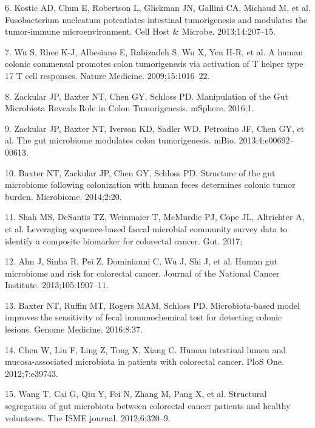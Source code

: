 \documentclass[12pt,]{article}
\begin{document}
\hypertarget{ref-kostic_fusobacterium_2013}{}
6. Kostic AD, Chun E, Robertson L, Glickman JN, Gallini CA, Michaud M,
et al. Fusobacterium nucleatum potentiates intestinal tumorigenesis and
modulates the tumor-immune microenvironment. Cell Host \& Microbe.
2013;14:207--15.

\hypertarget{ref-wu_human_2009}{}
7. Wu S, Rhee K-J, Albesiano E, Rabizadeh S, Wu X, Yen H-R, et al. A
human colonic commensal promotes colon tumorigenesis via activation of T
helper type 17 T cell responses. Nature Medicine. 2009;15:1016--22.

\hypertarget{ref-zackular_manipulation_2016}{}
8. Zackular JP, Baxter NT, Chen GY, Schloss PD. Manipulation of the Gut
Microbiota Reveals Role in Colon Tumorigenesis. mSphere. 2016;1.

\hypertarget{ref-zackular_gut_2013}{}
9. Zackular JP, Baxter NT, Iverson KD, Sadler WD, Petrosino JF, Chen GY,
et al. The gut microbiome modulates colon tumorigenesis. mBio.
2013;4:e00692--00613.

\hypertarget{ref-baxter_structure_2014}{}
10. Baxter NT, Zackular JP, Chen GY, Schloss PD. Structure of the gut
microbiome following colonization with human feces determines colonic
tumor burden. Microbiome. 2014;2:20.

\hypertarget{ref-shah_leveraging_2017}{}
11. Shah MS, DeSantis TZ, Weinmaier T, McMurdie PJ, Cope JL, Altrichter
A, et al. Leveraging sequence-based faecal microbial community survey
data to identify a composite biomarker for colorectal cancer. Gut. 2017;

\hypertarget{ref-ahn_human_2013}{}
12. Ahn J, Sinha R, Pei Z, Dominianni C, Wu J, Shi J, et al. Human gut
microbiome and risk for colorectal cancer. Journal of the National
Cancer Institute. 2013;105:1907--11.

\hypertarget{ref-baxter_microbiota-based_2016}{}
13. Baxter NT, Ruffin MT, Rogers MAM, Schloss PD. Microbiota-based model
improves the sensitivity of fecal immunochemical test for detecting
colonic lesions. Genome Medicine. 2016;8:37.

\hypertarget{ref-chen_human_2012}{}
14. Chen W, Liu F, Ling Z, Tong X, Xiang C. Human intestinal lumen and
mucosa-associated microbiota in patients with colorectal cancer. PloS
One. 2012;7:e39743.

\hypertarget{ref-wang_structural_2012}{}
15. Wang T, Cai G, Qiu Y, Fei N, Zhang M, Pang X, et al. Structural
segregation of gut microbiota between colorectal cancer patients and
healthy volunteers. The ISME journal. 2012;6:320--9.
\end{document}
